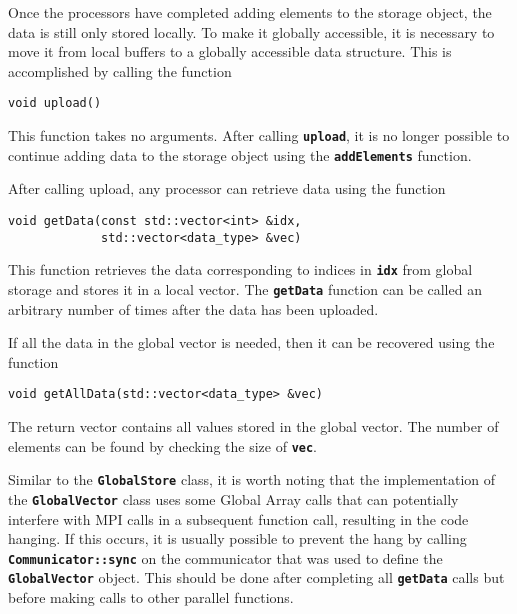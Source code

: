 Once the processors have completed adding elements to the storage object, the data is still only stored locally. To make it globally accessible, it is necessary to move it from local buffers to a globally accessible data structure. This is accomplished by calling the function

{
\color{red}
\begin{Verbatim}[fontseries=b]
void upload()
\end{Verbatim}
}

This function takes no arguments. After calling \texttt{\textbf{upload}}, it is
no longer possible to continue adding data to the storage object using the
\texttt{\textbf{addElements}} function.

After calling upload, any processor can retrieve data using the function

{
\color{red}
\begin{Verbatim}[fontseries=b]
void getData(const std::vector<int> &idx,
             std::vector<data_type> &vec)
\end{Verbatim}
}

This function retrieves the data corresponding to indices in
\texttt{\textbf{idx}} from global storage and stores it in a local vector. The
\texttt{\textbf{getData}} function can be called an arbitrary number of times after the data has been uploaded.

If all the data in the global vector is needed, then it can be recovered using
the function

{
\color{red}
\begin{Verbatim}[fontseries=b]
void getAllData(std::vector<data_type> &vec)
\end{Verbatim}
}

The return vector contains all values stored in the global vector. The number of
elements can be found by checking the size of \texttt{\textbf{vec}}.

Similar to the \texttt{\textbf{GlobalStore}} class, it is worth noting that
the implementation of the \texttt{\textbf{GlobalVector}} class uses some Global
Array calls that can potentially interfere with MPI calls in a subsequent
function call, resulting in the code hanging. If this occurs, it is usually
possible to prevent the hang by calling \texttt{\textbf{Communicator::sync}} on
the communicator that was used to define the \texttt{\textbf{GlobalVector}}
object. This should be done after completing all \texttt{\textbf{getData}} calls
but before making calls to other parallel functions.
